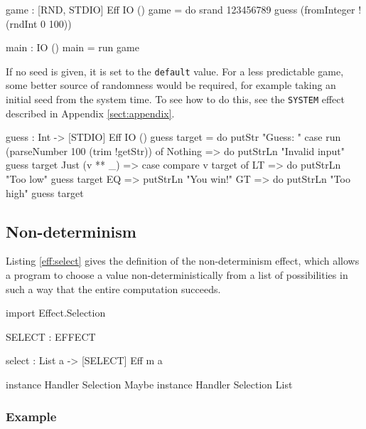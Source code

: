 \begin{code}
game : { [RND, STDIO] } Eff IO ()
game = do srand 123456789
          guess (fromInteger !(rndInt 0 100))

main : IO ()
main = run game
\end{code}

\noindent
If no seed is given, it is set to the \texttt{default} value. For a less
predictable game, some better source of randomness would be required, for
example taking an initial seed from the system time. To see how to do
this, see the \texttt{SYSTEM} effect described in Appendix \ref{sect:appendix}.

\begin{code}[frame=single,float,label=eff:game,caption={Guessing Game}]
guess : Int -> { [STDIO] } Eff IO ()
guess target
    = do putStr "Guess: "
         case run (parseNumber 100 (trim !getStr)) of
              Nothing => do putStrLn "Invalid input"
                            guess target
              Just (v ** _) =>
                         case compare v target of
                             LT => do putStrLn "Too low"
                                      guess target
                             EQ => putStrLn "You win!"
                             GT => do putStrLn "Too high"
                                      guess target
\end{code}

\subsection{Non-determinism}

Listing \ref{eff:select} gives the definition of the non-determinism effect,
which allows a program to choose a value non-deterministically from a list
of possibilities in such a way that the entire computation succeeds.

\begin{code}[float=h,frame=single,label=eff:select,caption={Non-determinism Effect}]
import Effect.Selection

SELECT : EFFECT

select : List a -> { [SELECT] } Eff m a 

instance Handler Selection Maybe
instance Handler Selection List
\end{code}

\subsubsection*{Example}

